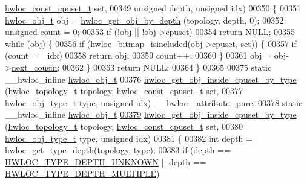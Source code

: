 \begin{DoxyCode}
      \hyperlink{a00040_ga1f784433e9b606261f62d1134f6a3b25}{hwloc_const_cpuset_t} \textcolor{keyword}{set},
00349                                       \textcolor{keywordtype}{unsigned} depth, \textcolor{keywordtype}{unsigned} idx)
00350 \{
00351   \hyperlink{a00016}{hwloc_obj_t} obj = \hyperlink{a00047_gaedd78240b0c1108355586a268ec5a697}{hwloc_get_obj_by_depth} (topology, depth, 0);
00352   \textcolor{keywordtype}{unsigned} count = 0;
00353   \textcolor{keywordflow}{if} (!obj || !obj->\hyperlink{a00016_a67925e0f2c47f50408fbdb9bddd0790f}{cpuset})
00354     \textcolor{keywordflow}{return} NULL;
00355   \textcolor{keywordflow}{while} (obj) \{
00356     \textcolor{keywordflow}{if} (\hyperlink{a00065_gaae29e14a926c198e8f91e6e4790621e7}{hwloc_bitmap_isincluded}(obj->\hyperlink{a00016_a67925e0f2c47f50408fbdb9bddd0790f}{cpuset}, \textcolor{keyword}{set})) \{
00357       \textcolor{keywordflow}{if} (count == idx)
00358         \textcolor{keywordflow}{return} obj;
00359       count++;
00360     \}
00361     obj = obj->\hyperlink{a00016_a85a788017457129589318b6c39451acf}{next_cousin};
00362   \}
00363   \textcolor{keywordflow}{return} NULL;
00364 \}
00365 
00375 \textcolor{keyword}{static} \_\_hwloc\_inline \hyperlink{a00016}{hwloc_obj_t}
00376 \hyperlink{a00054_gaa8dcdb85224f7350b90fb0a1ca91e6d6}{hwloc_get_obj_inside_cpuset_by_type} (\hyperlink{a00039_ga9d1e76ee15a7dee158b786c30b6a6e38}{hwloc_topology_t} topology, 
      \hyperlink{a00040_ga1f784433e9b606261f62d1134f6a3b25}{hwloc_const_cpuset_t} \textcolor{keyword}{set},
00377                                      \hyperlink{a00041_gacd37bb612667dc437d66bfb175a8dc55}{hwloc_obj_type_t} type, \textcolor{keywordtype}{unsigned} idx) \_\_hwloc
      \_attribute\_pure;
00378 \textcolor{keyword}{static} \_\_hwloc\_inline \hyperlink{a00016}{hwloc_obj_t}
\hypertarget{a00031_source_l00379}{}\hyperlink{a00054_gaa8dcdb85224f7350b90fb0a1ca91e6d6}{00379} \hyperlink{a00054_gaa8dcdb85224f7350b90fb0a1ca91e6d6}{hwloc_get_obj_inside_cpuset_by_type} (\hyperlink{a00039_ga9d1e76ee15a7dee158b786c30b6a6e38}{hwloc_topology_t} topology, 
      \hyperlink{a00040_ga1f784433e9b606261f62d1134f6a3b25}{hwloc_const_cpuset_t} \textcolor{keyword}{set},
00380                                      \hyperlink{a00041_gacd37bb612667dc437d66bfb175a8dc55}{hwloc_obj_type_t} type, \textcolor{keywordtype}{unsigned} idx)
00381 \{
00382   \textcolor{keywordtype}{int} depth = \hyperlink{a00046_gaea7c64dd59467f5201ba87712710b14d}{hwloc_get_type_depth}(topology, type);
00383   \textcolor{keywordflow}{if} (depth == \hyperlink{a00046_ggaf4e663cf42bbe20756b849c6293ef575a0565ab92ab72cb0cec91e23003294aad}{HWLOC_TYPE_DEPTH_UNKNOWN} || depth == \hyperlink{a00046_ggaf4e663cf42bbe20756b849c6293ef575ae99465995cacde6c210d5fc2e409798c}{HWLOC_TYPE_DEPTH_MULTIPLE})

\end{DoxyCode}
